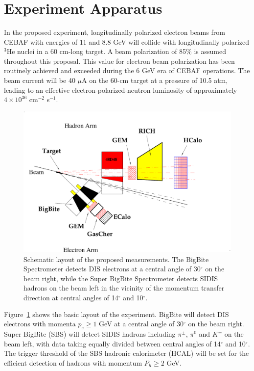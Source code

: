 \section{Experiment Apparatus}
\paragraph{}
In the proposed experiment, longitudinally polarized electron beams from CEBAF with energies of 11 and 8.8 GeV will collide with longitudinally polarized $^3$He nuclei in a 60 cm-long target. A beam polarization of 85\% is assumed throughout this proposal. This value for electron beam polarization has been routinely achieved and exceeded during the 6 GeV era of CEBAF operations. The beam current will be 40 $\mu$A on the 60-cm target at a pressure of 10.5 atm, leading to an effective electron-polarized-neutron luminosity of approximately $4\times 10^{36}$ cm$^{-2}$ s$^{-1}$. 
\begin{figure}[h]
  \begin{center}
    \includegraphics[width=.75\textwidth]{figures/SIDIS_layout.pdf}
  \end{center}
  \caption{\label{fig:cartoon} Schematic layout of the proposed measurements. The BigBite Spectrometer detects DIS electrons at a central angle of 30$^\circ$ on the beam right, while the Super BigBite Spectrometer detects SIDIS hadrons on the beam left in the vicinity of the momentum transfer direction at central angles of 14$^\circ$ and 10$^\circ$.}
\end{figure}
Figure~\ref{fig:cartoon} shows the basic layout of the experiment. BigBite will detect DIS electrons with momenta $p_e \ge 1$ GeV at a central angle of 30$^\circ$ on the beam right. Super BigBite (SBS) will detect SIDIS hadrons including $\pi^\pm$, $\pi^0$ and $K^\pm$ on the beam left, with data taking equally divided between central angles of 14$^\circ$ and 10$^\circ$. The trigger threshold of the SBS hadronic calorimeter (HCAL) will be set for the efficient detection of hadrons with momentum $P_h \ge 2$ GeV.
